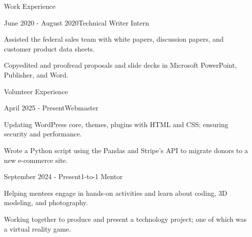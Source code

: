 \documentclass[11pt]{resume} %
\begin{document}
\begin{rSection}{\large Work Experience}

    	\begin{rSubsection}{\underline{}}{June 2020 - August 2020}{Technical Writer Intern}{}\small
		\item Assisted the federal sales team with white papers, discussion papers, and customer product data sheets.
		\item Copyedited and proofread proposals and slide decks in Microsoft PowerPoint, Publisher, and Word.
	\end{rSubsection}

\end{rSection}


\begin{rSection}{\large Volunteer Experience}

	\begin{rSubsection}{\underline{}}{April 2025 - Present}{Webmaster}{}\small
		\item Updating WordPress core, themes, plugins with HTML and CSS; ensuring security and performance.
		\item Wrote a Python script using the Pandas and Stripe's API to migrate donors to a new e-commerce site.
	\end{rSubsection}
    

	\begin{rSubsection}{\underline{}}{September 2024 - Present}{1-to-1 Mentor}{}\small
		\item Helping mentees engage in hands-on activities and learn about coding, 3D modeling, and photography.
		\item Working together to produce and present a technology project; one of which was a virtual reality game.
	\end{rSubsection}
\end{rSection}

\end{document}
